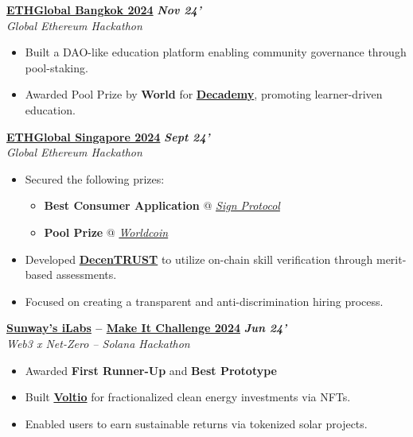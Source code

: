 \documentclass[letterpaper,10pt]{article}
\newcommand{\heading}[2]{
  \hspace{4pt}#1\hfill#2\\
}
\newcommand{\headingBf}[2]{
  \heading{\textbf{#1}}{
    \textbf{\textit{\small{#2}}}
  }
}
\newenvironment{bulletList}{
  \begin{itemize}[itemsep=1pt, parsep=1pt, leftmargin=26pt]
}{
  \end{itemize}
}
\newcommand{\oneFrag}[4]{
  \headingBf{#1}{#2}
  \hspace{6pt}\textit{#3}
  \vspace{-4pt}
  #4
}
\newenvironment{nestedBulletList}{
  \begin{itemize}[itemsep=1pt, parsep=1pt, leftmargin=14pt]
}{
  \end{itemize}
}
\begin{document}
\vspace{2pt}
\oneFrag{
  \href{https://ethglobal.com/events/bangkok}{ETHGlobal Bangkok 2024}
}{
  Nov 24'
}{
  Global Ethereum Hackathon
}{
  \begin{bulletList}
    \item Built a DAO-like education platform enabling community governance through pool-staking.
    \item Awarded Pool Prize by \textbf{World} for \textbf{\href{https://ethglobal.com/showcase/decademy-8g59p}{Decademy}}, promoting learner-driven education.
  \end{bulletList}
}

\vspace{2pt}
\oneFrag{
  \href{https://ethglobal.com/events/singapore2024}{ETHGlobal Singapore 2024}
}{
  Sept 24'
}{
  Global Ethereum Hackathon
}{
  \begin{bulletList}
    \item Secured the following prizes:
    \vspace{-4pt}
    \begin{nestedBulletList}
      \item \textbf{Best Consumer Application} @ \textit{\href{https://sign.global}{Sign Protocol}}
      \item \textbf{Pool Prize} @ \textit{\href{https://worldcoin.org}{Worldcoin}}
    \end{nestedBulletList}
    \item Developed \textbf{\href{https://ethglobal.com/showcase/decentrust-vwp81}{DecenTRUST}} to utilize on-chain skill verification through merit-based assessments.
    \item Focused on creating a transparent and anti-discrimination hiring process.
  \end{bulletList}
}

\vspace{2pt}
\oneFrag{
  \href{https://innovationlabs.sunway.edu.my}{Sunway's iLabs} -- \href{https://x.com/SuperteamMY/status/1815758624716931379}{Make It Challenge 2024}
}{
  Jun 24'
}{
  Web3 x Net-Zero -- Solana Hackathon
}{
  \begin{bulletList}
    \item Awarded \textbf{First Runner-Up} and \textbf{Best Prototype}
    \item Built \textbf{\href{https://github.com/eesuhn/voltio}{Voltio}} for fractionalized clean energy investments via NFTs.
    \item Enabled users to earn sustainable returns via tokenized solar projects.
  \end{bulletList}
}
\end{document}
